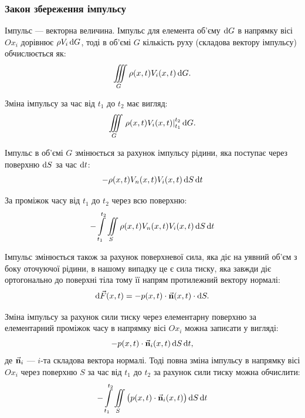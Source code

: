 \subsubsection{Закон збереження імпульсу}

Імпульс --- векторна величина. Імпульс для елемента об'єму $\diff G$ в напрямку вісі $Ox_i$ дорівнює $\rho V_i \diff G$, тоді в об'ємі $G$ кількість руху (складова вектору імпульсу) обчислюється як:
\begin{equation}
	\Iiint_G \rho(x, t) V_i(x, t) \diff G.
\end{equation}

Зміна імпульсу за час від $t_1$ до $t_2$ має вигляд: 
\begin{equation}
	\Iiint_G \left. \rho(x, t) V_i(x, t) \right|_{t_1}^{t_2} \diff G.
\end{equation}

Імпульс в об'ємі $G$ змінюється за рахунок імпульсу рідини, яка поступає через поверхню $\diff S$ за час $\diff t$:
\begin{equation}
	- \rho(x, t) V_n(x, t) V_i(x, t) \diff S \diff t
\end{equation}

За проміжок часу від $t_1$ до $t_2$ через всю поверхню:
\begin{equation}
	- \Int_{t_1}^{t_2} \Iint_S \rho(x, t) V_n(x, t) V_i(x, t) \diff S \diff t
\end{equation}

Імпульс змінюється також за рахунок поверхневої сила, яка діє на уявний об'єм з боку оточуючої рідини, в нашому випадку це є сила тиску, яка завжди діє ортогонально до поверхні тіла тому її напрям протилежний вектору нормалі: 
\begin{equation}
	\diff \vec F(x, t) = - p(x, t) \cdot \vec{\bf{n}} (x, t) \cdot \diff S.
\end{equation}

Зміна імпульсу за рахунок сили тиску через елементарну поверхню за елементарний проміжок часу в напрямку вісі $Ox_i$ можна записати у вигляді: 
\begin{equation}
	-p(x, t) \cdot \vec{\bf{n}}_i (x, t) \diff S \diff t,
\end{equation}
де $\vec{\bf{n}}_i$ --- $i$-та складова вектора нормалі. Тоді повна зміна імпульсу в напрямку вісі $Ox_i$ через поверхню $S$ за час від $t_1$ до $t_2$ за рахунок сили тиску можна обчислити:
\begin{equation}
	- \Int_{t_1}^{t_2} \Iint_S \big( p(x, t) \cdot \vec{\bf{n}}_i(x, t) \big) \diff S \diff t
\end{equation}

